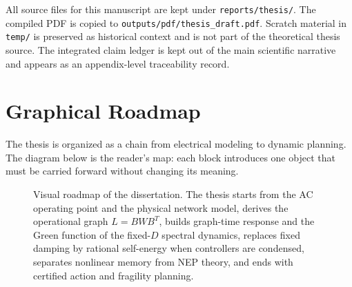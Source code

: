 \documentclass[11pt,letterpaper,oneside]{book}
\begin{document}
All source files for this manuscript are kept under \texttt{reports/thesis/}.
The compiled PDF is copied to \texttt{outputs/pdf/thesis\_draft.pdf}. Scratch
material in \texttt{temp/} is preserved as historical context and is not part of
the theoretical thesis source. The integrated claim ledger is kept out of the
main scientific narrative and appears as an appendix-level traceability record.

\chapter*{Graphical Roadmap}
The thesis is organized as a chain from electrical modeling to dynamic
planning. The diagram below is the reader's map: each block introduces one
object that must be carried forward without changing its meaning.

\begin{figure}[ht]
\centering
{}
\caption{Visual roadmap of the dissertation. The thesis starts from the AC
operating point and the physical network model, derives the operational graph
\(L=BWB^T\), builds graph-time response and the Green function of the
fixed-\(D\) spectral dynamics,
replaces fixed damping by rational self-energy when controllers are condensed,
separates nonlinear memory from NEP theory, and ends with certified action and
fragility planning.}
\label{fig:front_roadmap}
\end{figure}
\end{document}
